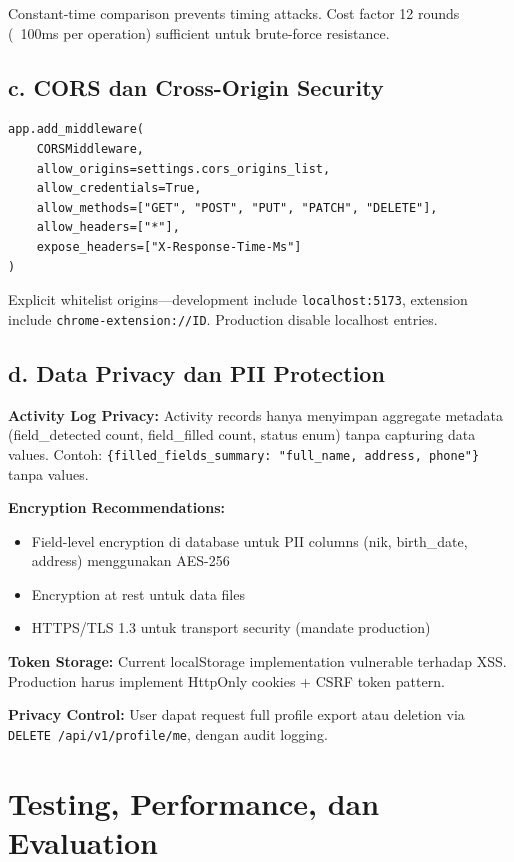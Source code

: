 \documentclass[12pt,a4paper]{article}
\begin{document}
Constant-time comparison prevents timing attacks. Cost factor 12 rounds (~100ms per operation) sufficient untuk brute-force resistance.

\subsection*{c. CORS dan Cross-Origin Security}

\begin{lstlisting}
app.add_middleware(
    CORSMiddleware,
    allow_origins=settings.cors_origins_list,
    allow_credentials=True,
    allow_methods=["GET", "POST", "PUT", "PATCH", "DELETE"],
    allow_headers=["*"],
    expose_headers=["X-Response-Time-Ms"]
)
\end{lstlisting}

Explicit whitelist origins—development include \texttt{localhost:5173}, extension include \texttt{chrome-extension://ID}. Production disable localhost entries.

\subsection*{d. Data Privacy dan PII Protection}

\textbf{Activity Log Privacy:} Activity records hanya menyimpan aggregate metadata (field\_detected count, field\_filled count, status enum) tanpa capturing data values. Contoh: \texttt{\{filled\_fields\_summary: "full\_name, address, phone"\}} tanpa values.

\textbf{Encryption Recommendations:}
\begin{itemize}
  \item Field-level encryption di database untuk PII columns (nik, birth\_date, address) menggunakan AES-256
  \item Encryption at rest untuk data files
  \item HTTPS/TLS 1.3 untuk transport security (mandate production)
\end{itemize}

\textbf{Token Storage:} Current localStorage implementation vulnerable terhadap XSS. Production harus implement HttpOnly cookies + CSRF token pattern.

\textbf{Privacy Control:} User dapat request full profile export atau deletion via \texttt{DELETE /api/v1/profile/me}, dengan audit logging.

\newpage

\section{Testing, Performance, dan Evaluation}
\end{document}
